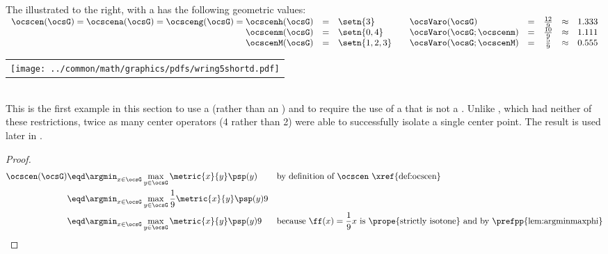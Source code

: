 \begin{tabstr}{0.75}
\begin{minipage}{\tw-65mm}%
\begin{example}%
\label{ex:wring5shortd}
The   illustrated to the right, with a  
has the following geometric values:
\\\indentx$\begin{array}{rcl@{\qquad} lcccl}
  \ocscen(\ocsG)=\ocscena(\ocsG)=\ocsceng(\ocsG)=\ocscenh(\ocsG) &=& \setn{3}    & \ocsVaro(\ocsG)          &=& \frac{12}{9} &\approx& 1.333\\
  \ocscenm(\ocsG)                                                &=& \setn{0,4}  & \ocsVaro(\ocsG;\ocscenm) &=& \frac{10}{9} &\approx& 1.111\\
  \ocscenM(\ocsG)                                                &=& \setn{1,2,3}& \ocsVaro(\ocsG;\ocscenM) &=& \frac{ 5}{9} &\approx& 0.555
\end{array}$
\end{example}
\end{minipage}\hfill%
\begin{tabular}{c}
  \gsize%
  {\texttt{[image: ../common/math/graphics/pdfs/wring5shortd.pdf]}}%
\end{tabular}
\\
This is the first example in this section to use a  
(rather than an  )
and to require the use of a   that is not a .
Unlike , which had neither of these restrictions,
twice as many center operators (4 rather than 2) were able to successfully isolate a single center point.
The  result is used later in .
\\
\begin{proof}
    \begin{align*}
      \ocscen(\ocsG)
        &\eqd \argmin_{x\in\ocsG}\max_{y\in\ocsG}\metric{x}{y}\psp(y)
        &&\text{by definition of $\ocscen$ \xref{def:ocscen}}
      \\&\eqd \argmin_{x\in\ocsG}\max_{y\in\ocsG}\frac{1}{9}\metric{x}{y}\psp(y)9
      \\&\eqd \argmin_{x\in\ocsG}\max_{y\in\ocsG}\metric{x}{y}\psp(y)9
        &&\text{because $\ff(x)=\frac{1}{9}x$ is \prope{strictly isotone} and by \prefpp{lem:argminmaxphi}}

\end{align*}
\end{proof}
\end{tabstr}
